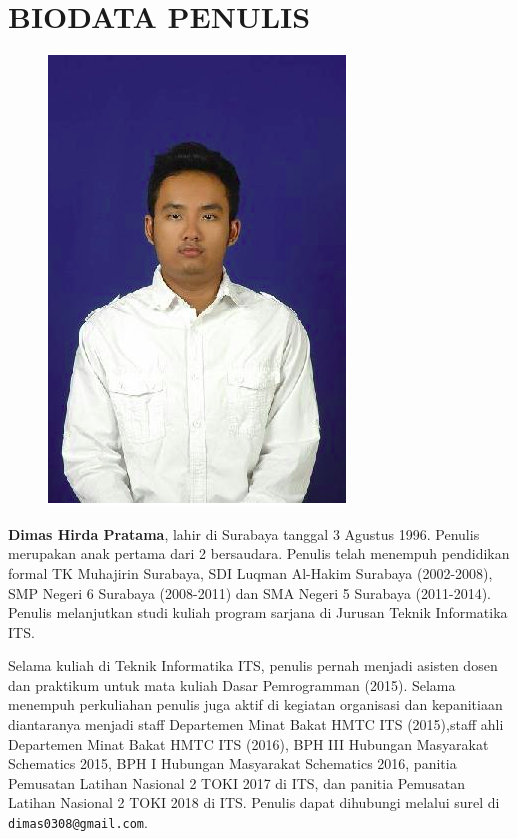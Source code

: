\chapter{BIODATA PENULIS}
\begin{figure}
	\includegraphics[height=0.3\textheight]{biodata/foto.png}
\end{figure}

\textbf{Dimas Hirda Pratama}, lahir di Surabaya tanggal 3 Agustus 1996. Penulis merupakan anak pertama dari 2 bersaudara. Penulis telah menempuh pendidikan formal TK Muhajirin Surabaya, SDI Luqman Al-Hakim Surabaya (2002-2008), SMP Negeri 6 Surabaya (2008-2011) dan SMA Negeri 5 Surabaya (2011-2014). Penulis melanjutkan studi kuliah program sarjana di Jurusan Teknik Informatika ITS. 

Selama kuliah di Teknik Informatika ITS, penulis  pernah menjadi asisten dosen dan praktikum untuk mata kuliah Dasar Pemrogramman (2015). Selama menempuh perkuliahan penulis juga aktif di kegiatan organisasi dan kepanitiaan diantaranya menjadi staff Departemen Minat Bakat HMTC ITS (2015),staff ahli Departemen Minat Bakat HMTC ITS (2016), BPH III Hubungan Masyarakat Schematics 2015, BPH I Hubungan Masyarakat Schematics 2016, panitia Pemusatan Latihan Nasional 2 TOKI 2017 di ITS, dan panitia Pemusatan Latihan Nasional 2 TOKI 2018 di ITS. Penulis dapat dihubungi melalui surel di \\ \texttt{dimas0308@gmail.com}.